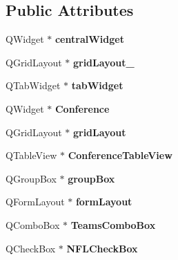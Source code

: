 \subsection*{Public Attributes}
\begin{DoxyCompactItemize}
\item 
\mbox{\label{class_ui___main_window_a30075506c2116c3ed4ff25e07ae75f81}} 
Q\+Widget $\ast$ {\bfseries central\+Widget}
\item 
\mbox{\label{class_ui___main_window_a6b2a0c5f7e8ff2a87134908dd770d2d2}} 
Q\+Grid\+Layout $\ast$ {\bfseries grid\+Layout\+\_}
\item 
\mbox{\label{class_ui___main_window_a3260b943854b841c986f47c4726ee7f9}} 
Q\+Tab\+Widget $\ast$ {\bfseries tab\+Widget}
\item 
\mbox{\label{class_ui___main_window_a44599cdae18cc6d9a8ccdb3c4391c8d5}} 
Q\+Widget $\ast$ {\bfseries Conference}
\item 
\mbox{\label{class_ui___main_window_a525ed3c5fe0784ac502ee222fba4e205}} 
Q\+Grid\+Layout $\ast$ {\bfseries grid\+Layout}
\item 
\mbox{\label{class_ui___main_window_ac7686ce338a15a95c55a81860afaa5e1}} 
Q\+Table\+View $\ast$ {\bfseries Conference\+Table\+View}
\item 
\mbox{\label{class_ui___main_window_aef7cb3be8cecfc9aaf98f036a98781ce}} 
Q\+Group\+Box $\ast$ {\bfseries group\+Box}
\item 
\mbox{\label{class_ui___main_window_afedcce3d8f3dddf4c1fd5b768660b8ee}} 
Q\+Form\+Layout $\ast$ {\bfseries form\+Layout}
\item 
\mbox{\label{class_ui___main_window_a9616d0f3fbadb2b92314f6d033fff578}} 
Q\+Combo\+Box $\ast$ {\bfseries Teams\+Combo\+Box}
\item 
\mbox{\label{class_ui___main_window_aebb039e3f09a651f0037929e8acf340e}} 
Q\+Check\+Box $\ast$ {\bfseries N\+F\+L\+Check\+Box}

\end{DoxyCompactItemize}
